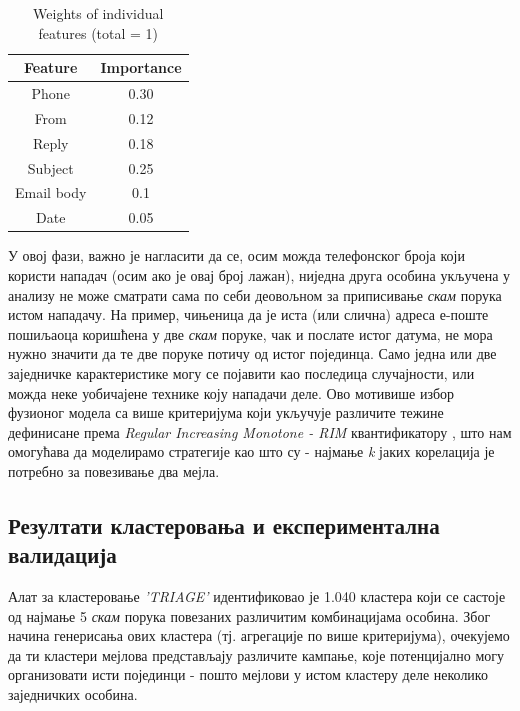 \documentclass[a4paper]{article}
\begin{document}
\begin{table}[h!]
\begin{center}
\caption{Weights of individual features (total = 1)}
\begin{tabular}{|c|c|} \hline
\textbf{Feature} & \textbf{Importance} \\ \hline
Phone & 0.30\\ \hline
From & 0.12\\ \hline
Reply & 0.18\\ \hline
Subject & 0.25\\ \hline
Email body & 0.1\\ \hline
Date & 0.05\\ \hline
\end{tabular}
\label{tab:tabela3}
\end{center}
\end{table}

У овој фази, важно је нагласити да се, осим можда телефонског броја који користи нападач (осим ако је овај број лажан), ниједна друга особина укључена у анализу не може сматрати сама по себи деовољном за приписивање \emph{скам} порука истом нападачу. На пример, чињеница да је иста (или слична) адреса е-поште пошиљаоца коришћена у две \emph{скам} поруке, чак и послате истог датума, не мора нужно значити да те две поруке потичу од истог појединца. Само једна или две заједничке карактеристике могу се појавити као последица случајности, или можда неке уобичајене технике коју нападачи деле. Ово мотивише избор фузионог модела са више критеријума који укључује различите тежине дефинисане према \emph{Regular Increasing Monotone - RIM} квантификатору \cite{rim}, што нам омогућава да моделирамо стратегије као што су - најмање \emph{k} јаких корелација је потребно за повезивање два мејла.

\subsection{Резултати кластеровања и експериментална валидација}
Алат за кластеровање \emph{'TRIAGE'} идентификовао је 1.040 кластера који се састоје од најмање 5 \emph{скам} порука повезаних различитим комбинацијама особина. Због начина генерисања ових кластера (тј. агрегације по више критеријума), очекујемо да ти кластери мејлова представљају различите кампање, које потенцијално могу организовати исти појединци - пошто мејлови у истом кластеру деле неколико заједничких особина.
\end{document}

